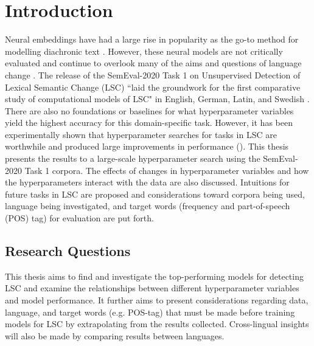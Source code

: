 

\section{Introduction}
\label{sec:intro}

Neural embeddings have had a large rise in popularity as the go-to method for modelling diachronic text \citep{diachronicwordembeddingssurvey-kutuzov2018, tahmasebi-survey2018}. However, these neural models are not critically evaluated and continue to overlook many of the aims and questions of language change \citep{hengchen2021challenges}. The release of the SemEval-2020 Task 1 on Unsupervised Detection of Lexical Semantic Change (LSC) \citep{schlechtweg-etal-2020-semeval} ``laid the groundwork for the first comparative study of computational models of LSC" in English, German, Latin, and Swedish \citep{hengchen2021SBXrushifteval}. There are also no foundations or baselines for what hyperparameter variables yield the highest accuracy for this domain-specific task. However, it has been experimentally shown that hyperparameter searches for tasks in LSC are worthwhile and produced large improvements in performance (\citet{kaiser-etal-2020-ims, hengchen2021SBXrushifteval}). This thesis presents the results to a large-scale hyperparameter search using the SemEval-2020 Task 1 corpora. The effects of changes in hyperparameter variables and how the hyperparameters interact with the data are also discussed. Intuitions for future tasks in LSC are proposed and considerations toward corpora being used, language being investigated, and target words (frequency and part-of-speech (POS) tag) for evaluation are put forth. 


\subsection{Research Questions}
This thesis aims to find and investigate the top-performing models for detecting LSC and examine the relationships between different hyperparameter variables and model performance. It further aims to present considerations regarding data, language, and target words (e.g. POS-tag) that must be made before training models for LSC by extrapolating from the results collected. Cross-lingual insights will also be made by comparing results between languages. 

